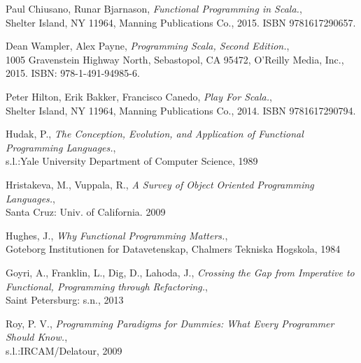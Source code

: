 \documentclass[12pt,twoside,a4paper]{report}
\begin{document}
\begin{thebibliography}{99}
Paul Chiusano,	Runar Bjarnason,
\emph{Functional Programming in Scala.},\\
Shelter Island, NY 11964,
Manning Publications Co., 2015. ISBN 9781617290657.

Dean Wampler, Alex Payne,
\emph{Programming Scala, Second Edition.},\\
1005 Gravenstein Highway North, Sebastopol, CA 95472,
O’Reilly Media, Inc., 2015. ISBN: 978-1-491-94985-6.
	
Peter Hilton, Erik Bakker, Francisco Canedo,
\emph{Play For Scala.},\\
Shelter Island, NY 11964,
Manning Publications Co., 2014. ISBN 9781617290794.

Hudak, P.,
\emph{The Conception, Evolution, and Application of Functional Programming Languages.},\\
s.l.:Yale University Department of Computer Science,
1989

Hristakeva, M., Vuppala, R.,
\emph{A Survey of Object Oriented Programming Languages.},\\
Santa Cruz: Univ. of California.
2009

Hughes, J.,
\emph{Why Functional Programming Matters.},\\
Goteborg Institutionen for Datavetenskap,
Chalmers Tekniska Hogskola, 1984


Goyri, A., Franklin, L., Dig, D., Lahoda, J.,
\emph{Crossing the Gap from Imperative to Functional, Programming through Refactoring.},\\
Saint Petersburg: s.n.,
2013

Roy, P. V.,
\emph{Programming Paradigms for Dummies: What Every Programmer Should Know.},\\
s.l.:IRCAM/Delatour,
2009

\end{thebibliography}
\end{document}
